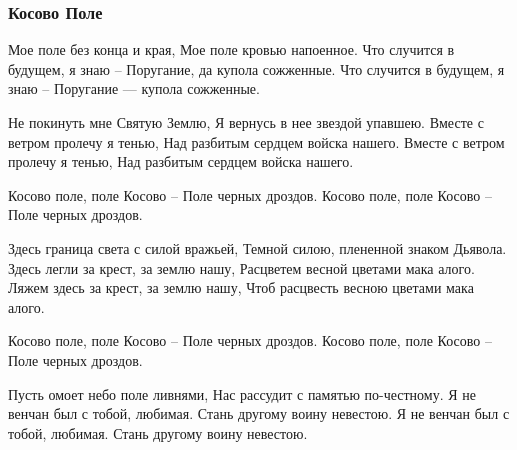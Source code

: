  
 
 

\subsubsection{Косово Поле}
\label{sec:poetry.rus.valerii_kipelov.kosovo_pole}

Мое поле без конца и края,
Мое поле кровью напоенное.
Что случится в будущем, я знаю –
Поругание, да купола сожженные.
Что случится в будущем, я знаю –
Поругание --- купола сожженные.

Не покинуть мне Святую Землю,
Я вернусь в нее звездой упавшею.
Вместе с ветром пролечу я тенью,
Над разбитым сердцем войска нашего.
Вместе с ветром пролечу я тенью,
Над разбитым сердцем войска нашего.

Косово поле, поле Косово –
Поле черных дроздов.
Косово поле, поле Косово –
Поле черных дроздов.

Здесь граница света с силой вражьей,
Темной силою, плененной знаком Дьявола.
Здесь легли за крест, за землю нашу,
Расцветем весной цветами мака алого.
Ляжем здесь за крест, за землю нашу,
Чтоб расцвесть весною цветами мака алого.

Косово поле, поле Косово –
Поле черных дроздов.
Косово поле, поле Косово –
Поле черных дроздов.

Пусть омоет небо поле ливнями,
Нас рассудит с памятью по-честному.
Я не венчан был с тобой, любимая.
Стань другому воину невестою.
Я не венчан был с тобой, любимая.
Стань другому воину невестою.

